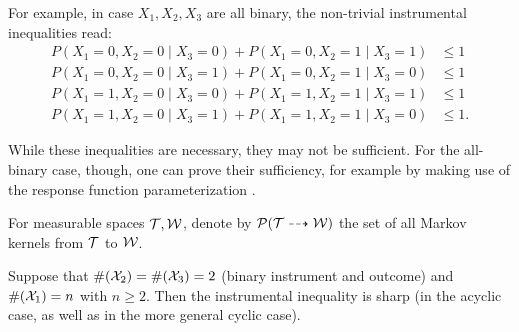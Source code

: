 \begin{Eg}\label{eg:instrumental_inequality_binary}
  For example, in case $X_1,X_2,X_3$ are all binary, the non-trivial instrumental inequalities read:
  \begin{align*}
    P(X_1=0,X_2=0 \mid X_3=0) + P(X_1=0,X_2=1 \mid X_3=1) &\le 1 \\
    P(X_1=0,X_2=0 \mid X_3=1) + P(X_1=0,X_2=1 \mid X_3=0) &\le 1 \\
    P(X_1=1,X_2=0 \mid X_3=0) + P(X_1=1,X_2=1 \mid X_3=1) &\le 1 \\
    P(X_1=1,X_2=0 \mid X_3=1) + P(X_1=1,X_2=1 \mid X_3=0) &\le 1.
  \end{align*}
\end{Eg}
While these inequalities are necessary, they may not be sufficient. For the all-binary case, though, one can prove their sufficiency,
for example by making use of the response function parameterization \cite{Bonet2001}.
\begin{Not}
  For measurable spaces $\mathcal{T}, \mathcal{W}$, denote by $\mathcal{P}(\mathcal{T} \dashrightarrow \mathcal{W})$ the set of all Markov kernels from $\mathcal{T}$ to $\mathcal{W}$.
\end{Not}
\begin{Prp}\label{prp:instrumental_inequality_completeness}
  Suppose that $\#(\mathcal{X}_2)=\#(\mathcal{X}_3) = 2$ (binary instrument and outcome) and $\#(\mathcal{X}_1)=n$ with $n \ge 2$.
  Then the instrumental inequality  is sharp (in the acyclic case, as well as in the more general cyclic case).
\end{Prp}
